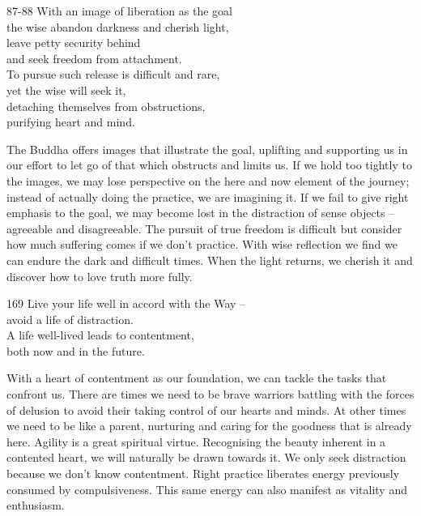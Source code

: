 

\begin{dhpVerse}{87-88}
\label{dhp-87}\label{dhp-88}
With an image of liberation as the goal\\
the wise abandon darkness and cherish light,\\
leave petty security behind\\
and seek freedom from attachment.\\
To pursue such release is difficult and rare,\\
yet the wise will seek it,\\
detaching themselves from obstructions,\\
purifying heart and mind.
\end{dhpVerse}

\begin{dhpRefl}

The Buddha offers images that illustrate the goal, uplifting and
supporting us in our effort to let go of that which obstructs and
limits us. If we hold too tightly to the images, we may lose
perspective on the here and now element of the journey; instead of
actually doing the practice, we are imagining it. If we fail to give
right emphasis to the goal, we may become lost in the distraction of
sense objects -- agreeable and disagreeable. The pursuit of true
freedom is difficult but consider how much suffering comes if we
don't practice. With wise reflection we find we can endure the dark
and difficult times. When the light returns, we cherish it and
discover how to love truth more fully.

\end{dhpRefl}


\begin{dhpVerse}{169}
\label{dhp-169}
Live your life well in accord with the Way --\\
avoid a life of distraction.\\
A life well-lived leads to contentment,\\
both now and in the future.
\end{dhpVerse}

\begin{dhpRefl}

With a heart of contentment as our foundation, we can tackle the
tasks that confront us. There are times we need to be brave warriors
battling with the forces of delusion to avoid their taking control of
our hearts and minds. At other times we need to be like a parent,
nurturing and caring for the goodness that is already here. Agility
is a great spiritual virtue. Recognising the beauty inherent in a
contented heart, we will naturally be drawn towards it. We only seek
distraction because we don't know contentment. Right practice
liberates energy previously consumed by compulsiveness. This same
energy can also manifest as vitality and enthusiasm.

\end{dhpRefl}

